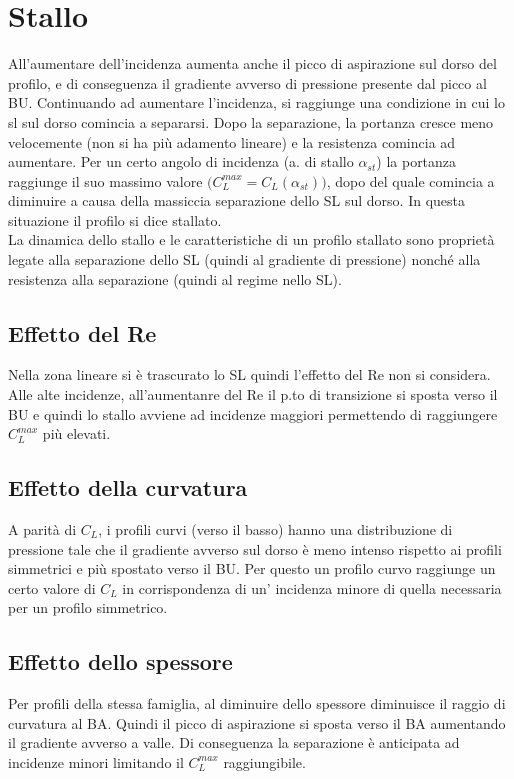 \documentclass[11pt,a4paper]{report}
\newcommand{\sz}[1]{\scriptsize #1\normalsize}
\begin{document}
	\section{Stallo}
	All'aumentare dell'incidenza aumenta anche il picco di aspirazione sul dorso del profilo, e di conseguenza il gradiente avverso di pressione presente dal picco al BU. Continuando ad aumentare l'incidenza, si raggiunge una condizione in cui lo sl sul dorso comincia a separarsi. Dopo la separazione, la portanza cresce meno velocemente (non si ha più adamento lineare) e la resistenza comincia ad aumentare. Per un certo angolo di incidenza (a. di stallo $\alpha_{st}$) la portanza raggiunge il suo massimo valore $\big(C_L^{max}=C_L(\alpha_{st})\big)$, dopo del quale comincia a diminuire a causa della massiccia separazione dello SL sul dorso. In questa situazione il profilo si dice stallato.\\
	La dinamica dello stallo e le caratteristiche di un profilo stallato sono proprietà legate alla separazione dello SL (quindi al gradiente di pressione) nonché alla resistenza alla separazione (quindi al regime nello SL).
		\subsection{Effetto del Re}
		Nella zona lineare si è trascurato lo SL quindi l'effetto del Re non si considera. Alle alte incidenze, all'aumentanre del Re il p.to di transizione si sposta verso il BU e quindi lo stallo avviene ad incidenze maggiori permettendo di raggiungere $C_L^{max}$ più elevati.
		\subsection{Effetto della curvatura}
		A parità di $C_L$, i profili curvi \sz{(verso il basso)} hanno una distribuzione di pressione tale che il gradiente avverso sul dorso è meno intenso rispetto ai profili simmetrici e più spostato verso il BU. Per questo un profilo curvo raggiunge un certo valore di $C_L$ in corrispondenza di un' incidenza minore di quella necessaria per un profilo simmetrico.
		\subsection{Effetto dello spessore}	
		Per profili della stessa famiglia, al diminuire dello spessore diminuisce il raggio di curvatura al BA. Quindi il picco di aspirazione si sposta verso il BA aumentando il gradiente avverso a valle. Di conseguenza la separazione è anticipata ad incidenze minori limitando il $C_L^{max}$ raggiungibile.
\end{document}
